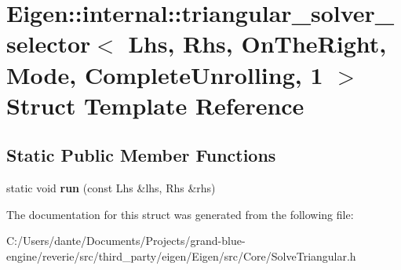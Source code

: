 \hypertarget{struct_eigen_1_1internal_1_1triangular__solver__selector_3_01_lhs_00_01_rhs_00_01_on_the_right_0718422e7095664eb478cc4024fd5b399}{}\section{Eigen\+::internal\+::triangular\+\_\+solver\+\_\+selector$<$ Lhs, Rhs, On\+The\+Right, Mode, Complete\+Unrolling, 1 $>$ Struct Template Reference}
\label{struct_eigen_1_1internal_1_1triangular__solver__selector_3_01_lhs_00_01_rhs_00_01_on_the_right_0718422e7095664eb478cc4024fd5b399}
\subsection*{Static Public Member Functions}
\begin{DoxyCompactItemize}
\item 
\mbox{\label{struct_eigen_1_1internal_1_1triangular__solver__selector_3_01_lhs_00_01_rhs_00_01_on_the_right_0718422e7095664eb478cc4024fd5b399_aace287bcfd7484d61cfd1acf0b686495}} 
static void {\bfseries run} (const Lhs \&lhs, Rhs \&rhs)
\end{DoxyCompactItemize}


The documentation for this struct was generated from the following file\+:\begin{DoxyCompactItemize}
\item 
C\+:/\+Users/dante/\+Documents/\+Projects/grand-\/blue-\/engine/reverie/src/third\+\_\+party/eigen/\+Eigen/src/\+Core/Solve\+Triangular.\+h\end{DoxyCompactItemize}
